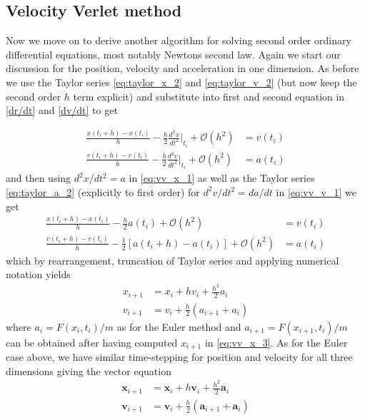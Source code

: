 \documentclass[12pt]{article}
\numberwithin{figure}{section}
\numberwithin{table}{section}
\begin{document}
\subsection{Velocity Verlet method} \label{sec:verlet}
Now we move on to derive another algorithm for solving second order ordinary differential equations, most notably Newtons second law. Again we start our discussion for the position, velocity and acceleration in one dimension. As before we use the Taylor series \eqref{eq:taylor_x_2} and \eqref{eq:taylor_v_2} (but now keep the second order $h$ term explicit) and substitute into first and second equation in \eqref{dr/dt} and \eqref{dv/dt} to get


\begin{align}
	\frac{x(t_i+h)-x(t_i)}{h}-\frac{h}{2}\frac{d^2x}{dt^2}\Bigr|_{t_i}+\mathcal{O}(h^2)&=v(t_i) \label{eq:vv_x_1}\\[0.2cm]
    \frac{v(t_i+h)-v(t_i)}{h}-\frac{h}{2}\frac{d^2v}{dt^2}\Bigr|_{t_i}+\mathcal{O}(h^2)&=a(t_i) \label{eq:vv_v_1}
\end{align}
and then using $d^2x/dt^2=a$ in \eqref{eq:vv_x_1} as well as the Taylor series \eqref{eq:taylor_a_2} (explicitly to first order) for $d^2v/dt^2=da/dt$ in \eqref{eq:vv_v_1} we get
\begin{align}
	\frac{x(t_i+h)-x(t_i)}{h}-\frac{h}{2}a(t_i)+\mathcal{O}(h^2)&=v(t_i) \label{eq:vv_x_2}\\[0.2cm]
    \frac{v(t_i+h)-v(t_i)}{h}-\frac{1}{2}[a(t_i+h)-a(t_i)]+\mathcal{O}(h^2)&=a(t_i) \label{eq:vv_v_2}
\end{align}
which by rearrangement, truncation of Taylor series and applying numerical notation yields
\begin{align}
	x_{i+1}&=x_i+hv_i+\frac{h^2}{2}a_i \label{eq:vv_x_3} \\
    v_{i+1}&=v_i+\frac{h}{2}(a_{i+1}+a_i) \label{eq:vv_v_3}
\end{align}
where $a_i=F(x_i,t_i)/m$ as for the Euler method and $a_{i+1}=F(x_{i+1},t_i)/m$ can be obtained after having computed $x_{i+1}$ in \eqref{eq:vv_x_3}. As for the Euler case above, we have similar time-stepping for position and velocity for all three dimensions giving the vector equation
\begin{align}
	\mathbf{x}_{i+1}&=\mathbf{x}_i+h\mathbf{v}_i+\frac{h^2}{2}\mathbf{a}_i \label{eq:vv_x_3D} \\
    \mathbf{v}_{i+1}&=\mathbf{v}_i+\frac{h}{2}(\mathbf{a}_{i+1}+\mathbf{a}_i) \label{eq:vv_v_3D}
\end{align}
\end{document}
